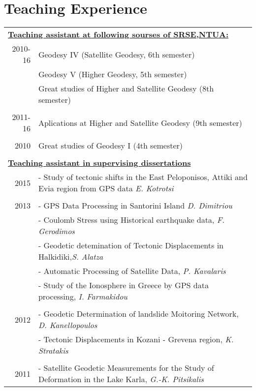 \documentclass[a4paper]{Classes/cv_prof_en} %
\begin{document}
\section{Teaching Experience}
\begin{longtable}{r|l}
\multicolumn{2}{l}{\underline{\textbf{Teaching assistant at following sourses of SRSE,NTUA:}}}\\
\textsc{}2010-16   & Geodesy IV (Satellite Geodesy, 6th semester)\\
                        & Geodesy V (Higher Geodesy, 5th semester)\\
                        & Great studies of Higher and Satellite Geodesy (8th semester)\\
\multicolumn{2}{c}{}\\
\textsc{}2011-16   & Aplications at Higher and Satellite Geodesy (9th semester)\\
\multicolumn{2}{c}{}\\
\textsc{}2010           & Great studies  of Geodesy I (4th semester)\\
\multicolumn{2}{c}{}\\
\multicolumn{2}{l}{\textbf{\underline{Teaching assistant in supervising dissertations}}}\\
\textsc{}2015
		& - Study of tectonic shifts in the East Peloponisos, Attiki and Evia region from GPS data \textit{E. Kotrotsi}\\
\multicolumn{2}{l}{}\\
\textsc{}2013  	
		& - GPS Data Processing in Santorini Island \textit{D. Dimitriou}\\
		& - Coulomb Stress using Historical earthquake data, \textit{F. Gerodimos}\\
		& - Geodetic detemination of Tectonic Displacements in Halkidiki,\textit{S. Alatza} \\
		& - Automatic Processing of Satellite Data, \textit{P. Kavalaris}\\
		& - Study of the Ionosphere in Greece by GPS data processing, \textit{I. Farmakidou}\\
\multicolumn{2}{l}{}\\
\textsc{}2012	& - Geodetic Determination of landslide Moitoring Network, \textit{D. Kanellopoulos}\\
		& - Tectonic Displacements in Kozani - Grevena region, \textit{K. Stratakis}\\
\multicolumn{2}{c}{}\\
\textsc{}2011   & - Satellite Geodetic Measurements for the Study of Deformation in the Lake Karla, \textit{G.-K. Pitsikalis}\\

\end{longtable}
\end{document}
